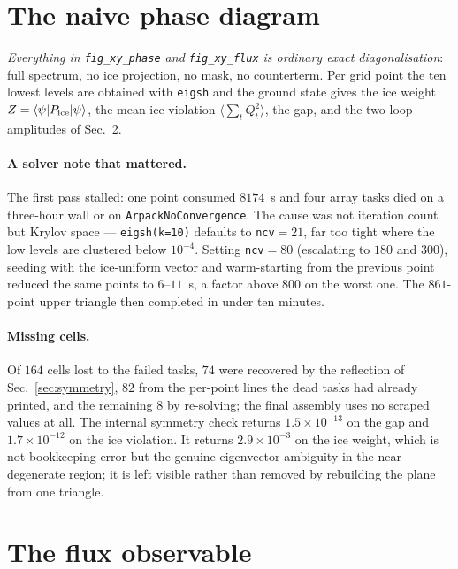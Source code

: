 \documentclass[11pt]{article}
\newcommand{\Pice}{P_{\rm ice}}
\begin{document}
\section{The naive phase diagram}

\emph{Everything in \texttt{fig\_xy\_phase} and \texttt{fig\_xy\_flux} is
ordinary exact diagonalisation}: full spectrum, no ice projection, no mask,
no counterterm.  Per grid point the ten lowest levels are obtained with
\texttt{eigsh} and the ground state gives the ice weight
$Z=\langle\psi|\Pice|\psi\rangle$, the mean ice violation
$\langle\sum_t Q_t^2\rangle$, the gap, and the two loop amplitudes of
Sec.~\ref{sec:flux}.

\paragraph{A solver note that mattered.}  The first pass stalled: one point
consumed $8174$~s and four array tasks died on a three-hour wall or on
\texttt{ArpackNoConvergence}.  The cause was not iteration count but Krylov
space --- \texttt{eigsh(k=10)} defaults to \texttt{ncv}$=21$, far too tight
where the low levels are clustered below $10^{-4}$.  Setting
\texttt{ncv}$=80$ (escalating to $180$ and $300$), seeding with the
ice-uniform vector and warm-starting from the previous point reduced the
same points to $6$--$11$~s, a factor above $800$ on the worst one.  The
$861$-point upper triangle then completed in under ten minutes.

\paragraph{Missing cells.}  Of $164$ cells lost to the failed tasks, $74$
were recovered by the reflection of Sec.~\ref{sec:symmetry}, $82$ from the
per-point lines the dead tasks had already printed, and the remaining $8$
by re-solving; the final assembly uses no scraped values at all.  The
internal symmetry check returns $1.5\times10^{-13}$ on the gap and
$1.7\times10^{-12}$ on the ice violation.  It returns $2.9\times10^{-3}$ on
the ice weight, which is not bookkeeping error but the genuine eigenvector
ambiguity in the near-degenerate region; it is left visible rather than
removed by rebuilding the plane from one triangle.

\section{The flux observable}
\label{sec:flux}
\end{document}

